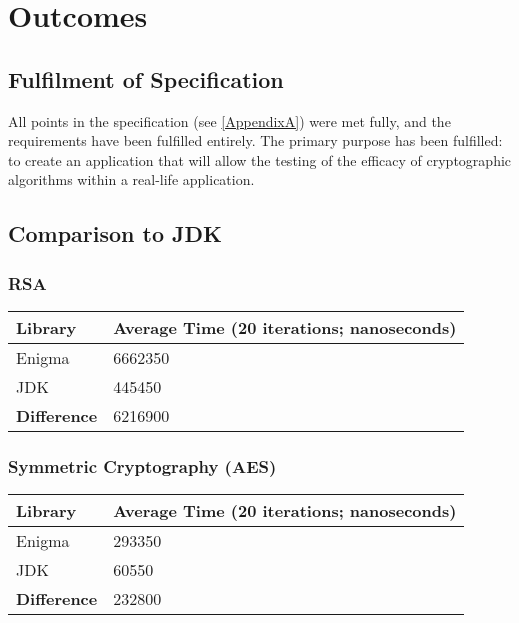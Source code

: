 
\chapter{Outcomes} 
\label{Chapter7}

\section{Fulfilment of Specification}

All points in the specification (see \textsection\ref{AppendixA}) were met fully, and the requirements have been fulfilled entirely. The primary purpose has been fulfilled: to create an application that will allow the testing of the efficacy of cryptographic algorithms within a real-life application.

\section{Comparison to JDK}

  \subsection{RSA}
  
    \begin{center}
      \begin{tabular}{ | l | p{4.0cm} |}
        \hline
        Library & Average Time (20 iterations; nanoseconds) \\ \hline \hline
        Enigma & 6662350 \\ \hline
        JDK & 445450 \\ \hline \hline
        \textbf{Difference} & 6216900 \\
        \hline
      \end{tabular}
    \end{center}
  
  \subsection{Symmetric Cryptography (AES)}
  
    \begin{center}
      \begin{tabular}{ | l | p{4.0cm} |}
        \hline
        Library & Average Time (20 iterations; nanoseconds) \\ \hline \hline
        Enigma & 293350 \\ \hline
        JDK & 60550 \\ \hline \hline
        \textbf{Difference} & 232800 \\
        \hline
      \end{tabular}
    \end{center}
    
